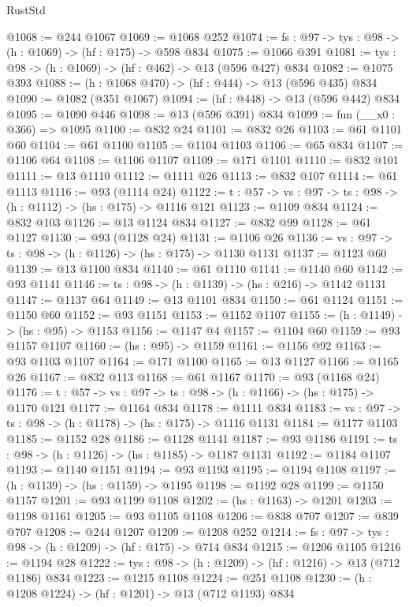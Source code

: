 \begin{lexlean}{RustStd}
\begin{coremodule}
@1068 := @244 @1067
@1069 := @1068 @252
@1074 := {fs : @97} -> {tys : @98} -> (h : @1069) -> (hf : @175) -> @598 @834
@1075 := @1066 @391
@1081 := {tys : @98} -> (h : @1069) -> (hf : @462) -> @13 (@596 @427) @834
@1082 := @1075 @393
@1088 := (h : @1068 @470) -> (hf : @444) -> @13 (@596 @435) @834
@1090 := @1082 (@351 @1067)
@1094 := (hf : @448) -> @13 (@596 @442) @834
@1095 := @1090 @446
@1098 := @13 (@596 @391) @834
@1099 := fun (__x0 : @366) => @1095
@1100 := @832 @24
@1101 := @832 @26
@1103 := @61 @1101 @60
@1104 := @61 @1100
@1105 := @1104 @1103
@1106 := @65 @834
@1107 := @1106 @64
@1108 := @1106 @1107
@1109 := @171 @1101
@1110 := @832 @101
@1111 := @13 @1110
@1112 := @1111 @26
@1113 := @832 @107
@1114 := @61 @1113
@1116 := @93 (@1114 @24)
@1122 := {t : @57} -> {vs : @97} -> {ts : @98} -> (h : @1112) -> (hs : @175) -> @1116 @121
@1123 := @1109 @834
@1124 := @832 @103
@1126 := @13 @1124 @834
@1127 := @832 @99
@1128 := @61 @1127
@1130 := @93 (@1128 @24)
@1131 := @1106 @26
@1136 := {vs : @97} -> {ts : @98} -> (h : @1126) -> (hs : @175) -> @1130 @1131
@1137 := @1123 @60
@1139 := @13 @1100 @834
@1140 := @61 @1110
@1141 := @1140 @60
@1142 := @93 @1141
@1146 := {ts : @98} -> (h : @1139) -> (hs : @216) -> @1142 @1131
@1147 := @1137 @64
@1149 := @13 @1101 @834
@1150 := @61 @1124
@1151 := @1150 @60
@1152 := @93 @1151
@1153 := @1152 @1107
@1155 := (h : @1149) -> (hs : @95) -> @1153
@1156 := @1147 @4
@1157 := @1104 @60
@1159 := @93 @1157 @1107
@1160 := (hs : @95) -> @1159
@1161 := @1156 @92
@1163 := @93 @1103 @1107
@1164 := @171 @1100
@1165 := @13 @1127
@1166 := @1165 @26
@1167 := @832 @113
@1168 := @61 @1167
@1170 := @93 (@1168 @24)
@1176 := {t : @57} -> {vs : @97} -> {ts : @98} -> (h : @1166) -> (hs : @175) -> @1170 @121
@1177 := @1164 @834
@1178 := @1111 @834
@1183 := {vs : @97} -> {ts : @98} -> (h : @1178) -> (hs : @175) -> @1116 @1131
@1184 := @1177 @1103
@1185 := @1152 @28
@1186 := @1128 @1141
@1187 := @93 @1186
@1191 := {ts : @98} -> (h : @1126) -> (hs : @1185) -> @1187 @1131
@1192 := @1184 @1107
@1193 := @1140 @1151
@1194 := @93 @1193
@1195 := @1194 @1108
@1197 := (h : @1139) -> (hs : @1159) -> @1195
@1198 := @1192 @28
@1199 := @1150 @1157
@1201 := @93 @1199 @1108
@1202 := (hs : @1163) -> @1201
@1203 := @1198 @1161
@1205 := @93 @1105 @1108
@1206 := @838 @707
@1207 := @839 @707
@1208 := @244 @1207
@1209 := @1208 @252
@1214 := {fs : @97} -> {tys : @98} -> (h : @1209) -> (hf : @175) -> @714 @834
@1215 := @1206 @1105
@1216 := @1194 @28
@1222 := {tys : @98} -> (h : @1209) -> (hf : @1216) -> @13 (@712 @1186) @834
@1223 := @1215 @1108
@1224 := @251 @1108
@1230 := (h : @1208 @1224) -> (hf : @1201) -> @13 (@712 @1193) @834

\end{coremodule}
\end{lexlean}
